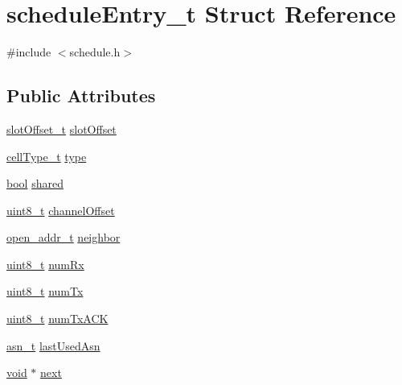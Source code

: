 \hypertarget{structschedule_entry__t}{}\section{schedule\+Entry\+\_\+t Struct Reference}
\label{structschedule_entry__t}


{\ttfamily \#include $<$schedule.\+h$>$}

\subsection*{Public Attributes}
\begin{DoxyCompactItemize}
\item 
\hyperlink{group___schedule_ga30a663860a70d8c9db2c3a8e66f544fc}{slot\+Offset\+\_\+t} \hyperlink{structschedule_entry__t_a635dac221078c4d63365ccf2b65fa273}{slot\+Offset}
\item 
\hyperlink{group___schedule_gad8490d4fdf8cef27f7e5fa6a37046a3d}{cell\+Type\+\_\+t} \hyperlink{structschedule_entry__t_ac6347609af7ef7e8adcf0a4d2a91991a}{type}
\item 
\hyperlink{_p_e___types_8h_a97a80ca1602ebf2303258971a2c938e2}{bool} \hyperlink{structschedule_entry__t_a6e99ef675df0af10aac4235181a1184f}{shared}
\item 
\hyperlink{_p_e___types_8h_aba7bc1797add20fe3efdf37ced1182c5}{uint8\+\_\+t} \hyperlink{structschedule_entry__t_aa969962bcdc2e067da69170415226c11}{channel\+Offset}
\item 
\hyperlink{structopen__addr__t}{open\+\_\+addr\+\_\+t} \hyperlink{structschedule_entry__t_a52208142c72b2c5b9ba473b3ddd51909}{neighbor}
\item 
\hyperlink{_p_e___types_8h_aba7bc1797add20fe3efdf37ced1182c5}{uint8\+\_\+t} \hyperlink{structschedule_entry__t_ae84de6e2444f784ace17da19c33f0e2c}{num\+Rx}
\item 
\hyperlink{_p_e___types_8h_aba7bc1797add20fe3efdf37ced1182c5}{uint8\+\_\+t} \hyperlink{structschedule_entry__t_a6887573f858a99315e44117d3d986603}{num\+Tx}
\item 
\hyperlink{_p_e___types_8h_aba7bc1797add20fe3efdf37ced1182c5}{uint8\+\_\+t} \hyperlink{structschedule_entry__t_a1d36b25d8c34eb5c55ca1b718cf4788b}{num\+Tx\+A\+CK}
\item 
\hyperlink{structasn__t}{asn\+\_\+t} \hyperlink{structschedule_entry__t_a3b05fd86dfceedf5bb49662089ee7405}{last\+Used\+Asn}
\item 
\hyperlink{usb__devapi_8h_afabf60e7f57651d6d595a02c75f07cd0}{void} $\ast$ \hyperlink{structschedule_entry__t_a13e3d86bb55df3decf594be0056947b3}{next}
\end{DoxyCompactItemize}



